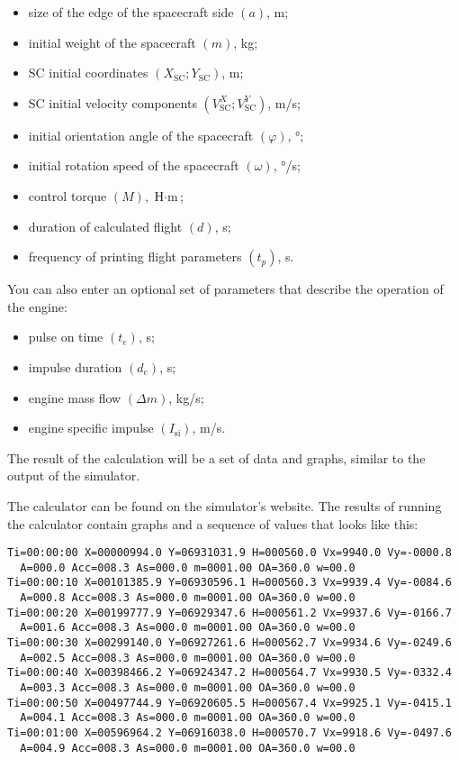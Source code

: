\documentclass[12pt,a4paper]{article}
\begin{document}
\begin{itemize}
\item size of the edge of the spacecraft side $(a)$, m;
\item initial weight of the spacecraft $(m)$, kg;
\item SC initial coordinates $(X_{\text{SC}}; Y_{\text{SC}})$, m;
\item SC initial velocity components $(V^X_{\text{SC}}; V^Y_{\text{SC}})$, m/s;
\item initial orientation angle of the spacecraft $(\varphi)$, °;
\item initial rotation speed of the spacecraft $(\omega)$, °/s;
\item control torque $(M)$, $\text{Н} \cdot \text{m}$;
\item duration of calculated flight $(d)$, s;
\item frequency of printing flight parameters $(t_p)$, s.
\end{itemize}

You can also enter an optional set of parameters that describe the operation of the engine:

\begin{itemize}
\item pulse on time $(t_e)$, s;
\item impulse duration $(d_e)$, s;
\item engine mass flow $(\Delta m)$, kg/s;
\item engine specific impulse $(I_{\text{si}})$, m/s.
\end{itemize}

The result of the calculation will be a set of data and graphs, similar to the output of the simulator.

The calculator can be found on the simulator's website. The results of running the calculator contain graphs and a sequence of values that looks like this:

\begin{verbatim}
Ti=00:00:00 X=00000994.0 Y=06931031.9 H=000560.0 Vx=9940.0 Vy=-0000.8
  A=000.0 Acc=008.3 As=000.0 m=0001.00 OA=360.0 w=00.0
Ti=00:00:10 X=00101385.9 Y=06930596.1 H=000560.3 Vx=9939.4 Vy=-0084.6
  A=000.8 Acc=008.3 As=000.0 m=0001.00 OA=360.0 w=00.0
Ti=00:00:20 X=00199777.9 Y=06929347.6 H=000561.2 Vx=9937.6 Vy=-0166.7
  A=001.6 Acc=008.3 As=000.0 m=0001.00 OA=360.0 w=00.0
Ti=00:00:30 X=00299140.0 Y=06927261.6 H=000562.7 Vx=9934.6 Vy=-0249.6
  A=002.5 Acc=008.3 As=000.0 m=0001.00 OA=360.0 w=00.0
Ti=00:00:40 X=00398466.2 Y=06924347.2 H=000564.7 Vx=9930.5 Vy=-0332.4
  A=003.3 Acc=008.3 As=000.0 m=0001.00 OA=360.0 w=00.0
Ti=00:00:50 X=00497744.9 Y=06920605.5 H=000567.4 Vx=9925.1 Vy=-0415.1
  A=004.1 Acc=008.3 As=000.0 m=0001.00 OA=360.0 w=00.0
Ti=00:01:00 X=00596964.2 Y=06916038.0 H=000570.7 Vx=9918.6 Vy=-0497.6
  A=004.9 Acc=008.3 As=000.0 m=0001.00 OA=360.0 w=00.0
\end{verbatim}
\end{document}
